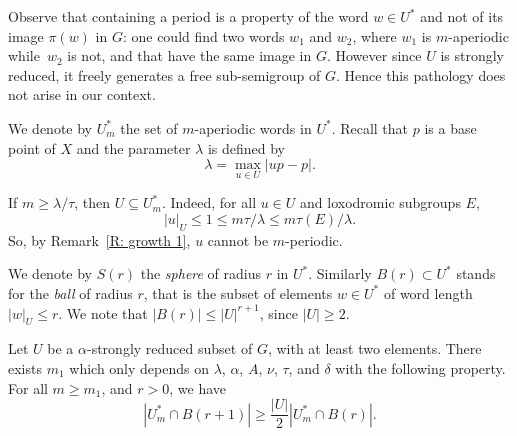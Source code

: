 Observe that containing a period is a property of the word $w \in U^*$ and not of its image $\pi(w)$ in $G$:
one could find two words $w_1$ and $w_2$, where $w_1$ is $m$-aperiodic while~$w_2$ is not, and that have the same image in $G$.
However since $U$ is strongly reduced, it freely generates a free sub-semigroup of $G$.
Hence this pathology does not arise in our context.

We denote by $U^*_m$ the set of $m$-aperiodic words in $U^*$.
Recall that $p$ is a base point of $X$ and the parameter $\lambda$ is defined by
\begin{equation*}
\lambda = \max_{u \in U} | up - p|.
\end{equation*}

\begin{ex}\label{E: proper power} If $m \geq \lambda/\tau$, then $U\subseteq U^*_m$.
Indeed, for all $u\in U$ and loxodromic subgroups $E$,
\[
|u|_U \leq 1 \leq m\tau/\lambda \leq m \tau(E)/\lambda.
\]
So, by Remark~\ref{R: growth 1}, $u$ cannot be $m$-periodic.
\end{ex}

We denote by $S(r)$ the \emph{sphere} of radius $r$ in $U^*$.
Similarly $B(r) \subset U^*$ stands for the \emph{ball} of radius $r$, that is the subset of elements $w\in U^*$ of word length $|w|_U \leqslant r$.
We note that $|B(r)|\leqslant |U|^{r+1}$, since $|U| \geq 2$.

\begin{prop}\label{P: aperiodic counting}
Let $U$ be a $\alpha$-strongly reduced subset of $G$, with at least two elements.
There exists $m_1$ which only depends on $\lambda$, $\alpha$, $A$, $\nu$, $\tau$, and $\delta$ with the following property.
For all $m \geq m_1$, and $r>0$, we have
\[
|U^*_m \cap B(r+1)| \geqslant \frac{|U|}2 |U^*_m \cap B(r)|.
\]
\end{prop}

